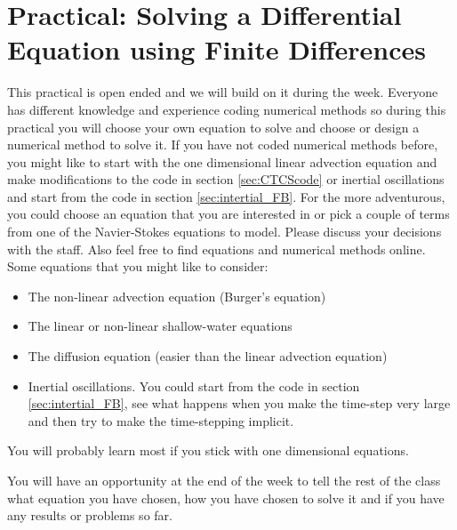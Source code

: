 \clearpage{}

\section{Practical: Solving a Differential Equation using Finite Differences}

This practical is open ended and we will build on it during the week.
Everyone has different knowledge and experience coding numerical methods
so during this practical you will choose your own equation to solve
and choose or design a numerical method to solve it. If you have not
coded numerical methods before, you might like to start with the one
dimensional linear advection equation and make modifications to the
code in section \ref{sec:CTCScode} or inertial oscillations and start
from the code in section \ref{sec:intertial_FB}. For the more adventurous,
you could choose an equation that you are interested in or pick a
couple of terms from one of the Navier-Stokes equations to model.
Please discuss your decisions with the staff. Also feel free to find
equations and numerical methods online. Some equations that you might
like to consider:
\begin{itemize}
\item The non-linear advection equation (Burger's equation)
\item The linear or non-linear shallow-water equations
\item The diffusion equation (easier than the linear advection equation)
\item Inertial oscillations. You could start from the code in section \ref{sec:intertial_FB},
see what happens when you make the time-step very large and then try
to make the time-stepping implicit.
\end{itemize}
You will probably learn most if you stick with one dimensional equations. 

You will have an opportunity at the end of the week to tell the rest
of the class what equation you have chosen, how you have chosen to
solve it and if you have any results or problems so far. 
